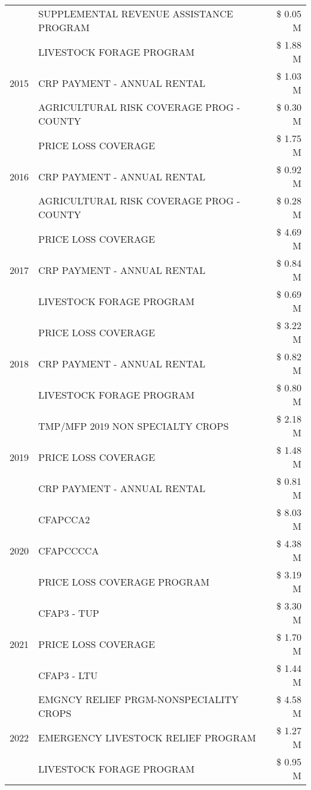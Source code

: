 \begin{tabular}{llr}
 & SUPPLEMENTAL REVENUE ASSISTANCE PROGRAM & \$ 0.05 M \\
\cline{1-3}
\multirow[t]{3}{*}{2015} & LIVESTOCK FORAGE PROGRAM & \$ 1.88 M \\
 & CRP PAYMENT - ANNUAL RENTAL & \$ 1.03 M \\
 & AGRICULTURAL RISK COVERAGE PROG - COUNTY & \$ 0.30 M \\
\cline{1-3}
\multirow[t]{3}{*}{2016} & PRICE LOSS COVERAGE & \$ 1.75 M \\
 & CRP PAYMENT - ANNUAL RENTAL & \$ 0.92 M \\
 & AGRICULTURAL RISK COVERAGE PROG - COUNTY & \$ 0.28 M \\
\cline{1-3}
\multirow[t]{3}{*}{2017} & PRICE LOSS COVERAGE & \$ 4.69 M \\
 & CRP PAYMENT - ANNUAL RENTAL & \$ 0.84 M \\
 & LIVESTOCK FORAGE PROGRAM & \$ 0.69 M \\
\cline{1-3}
\multirow[t]{3}{*}{2018} & PRICE LOSS COVERAGE & \$ 3.22 M \\
 & CRP PAYMENT - ANNUAL RENTAL & \$ 0.82 M \\
 & LIVESTOCK FORAGE PROGRAM & \$ 0.80 M \\
\cline{1-3}
\multirow[t]{3}{*}{2019} & TMP/MFP 2019 NON SPECIALTY CROPS & \$ 2.18 M \\
 & PRICE LOSS COVERAGE & \$ 1.48 M \\
 & CRP PAYMENT - ANNUAL RENTAL & \$ 0.81 M \\
\cline{1-3}
\multirow[t]{3}{*}{2020} & CFAPCCA2 & \$ 8.03 M \\
 & CFAPCCCCA & \$ 4.38 M \\
 & PRICE LOSS COVERAGE PROGRAM & \$ 3.19 M \\
\cline{1-3}
\multirow[t]{3}{*}{2021} & CFAP3 - TUP & \$ 3.30 M \\
 & PRICE LOSS COVERAGE & \$ 1.70 M \\
 & CFAP3 - LTU & \$ 1.44 M \\
\cline{1-3}
\multirow[t]{3}{*}{2022} & EMGNCY RELIEF PRGM-NONSPECIALITY CROPS & \$ 4.58 M \\
 & EMERGENCY LIVESTOCK RELIEF PROGRAM & \$ 1.27 M \\
 & LIVESTOCK FORAGE PROGRAM & \$ 0.95 M \\
\cline{1-3}
\bottomrule
\end{tabular}
